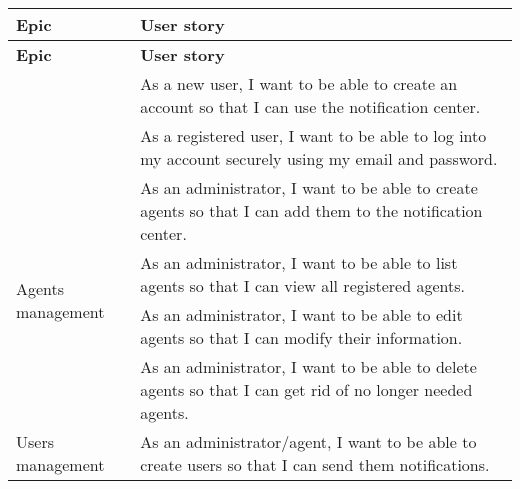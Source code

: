 \begin{longtable}{ | m{}  | m{} | }
      \hline
      \textbf{Epic}                                           & \textbf{User story}                                                                                                                                                   \\
      \hline
      \endfirsthead
      \hline
      \textbf{Epic}                                           & \textbf{User story}                                                                                                                                                   \\
      \hline
      \endhead
      \hline
      \endfoot
      \endlastfoot
      \multirow[t]{2}{5em}{Authentication}                    & As a new user, I want to be able to create an account so that I can use the notification center.                                                                      \\
      \cline{2-2}
                                                              & As a registered user, I want to be able to log into my account securely using my email and password.                                                                  \\
      \hline
      \multirow[t]{4}{5em}{Agents management}                 & As an administrator, I want to be able to create agents so that I can add them to the notification center.                                                            \\
      \cline{2-2}
                                                              & As an administrator, I want to be able to list agents so that I can view all registered agents.                                                                       \\
      \cline{2-2}
                                                              & As an administrator, I want to be able to edit agents so that I can modify their information.                                                                         \\
      \cline{2-2}
                                                              & As an administrator, I want to be able to delete agents so that I can get rid of no longer needed agents.                                                             \\
      \hline
      \multirow[t]{4}{5em}{Users management}                  & As an administrator/agent, I want to be able to create users so that I can send them notifications.                                                                   \\

\end{longtable}
